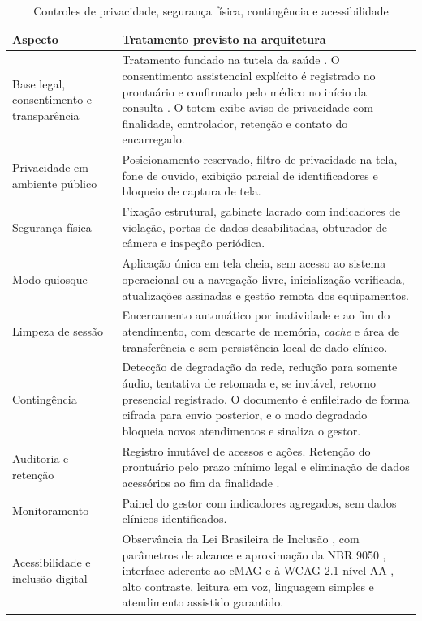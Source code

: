 \begin{table}[H]
\centering
\caption{Controles de privacidade, segurança física, contingência e acessibilidade}
\label{tab:controles}
\footnotesize
\begin{tabularx}{\textwidth}{L{3.3cm} Y}
\toprule
\textbf{Aspecto} & \textbf{Tratamento previsto na arquitetura} \\
\midrule
Base legal, consentimento e transparência & Tratamento fundado na tutela da saúde \cite{lgpd2018}. O consentimento assistencial explícito é registrado no prontuário e confirmado pelo médico no início da consulta \cite{cfm2314}. O totem exibe aviso de privacidade com finalidade, controlador, retenção e contato do encarregado. \\
Privacidade em ambiente público & Posicionamento reservado, filtro de privacidade na tela, fone de ouvido, exibição parcial de identificadores e bloqueio de captura de tela. \\
Segurança física & Fixação estrutural, gabinete lacrado com indicadores de violação, portas de dados desabilitadas, obturador de câmera e inspeção periódica. \\
Modo quiosque & Aplicação única em tela cheia, sem acesso ao sistema operacional ou a navegação livre, inicialização verificada, atualizações assinadas e gestão remota dos equipamentos. \\
Limpeza de sessão & Encerramento automático por inatividade e ao fim do atendimento, com descarte de memória, \textit{cache} e área de transferência e sem persistência local de dado clínico. \\
Contingência & Detecção de degradação da rede, redução para somente áudio, tentativa de retomada e, se inviável, retorno presencial registrado. O documento é enfileirado de forma cifrada para envio posterior, e o modo degradado bloqueia novos atendimentos e sinaliza o gestor. \\
Auditoria e retenção & Registro imutável de acessos e ações. Retenção do prontuário pelo prazo mínimo legal \cite{lei13787} e eliminação de dados acessórios ao fim da finalidade \cite{lgpd2018}. \\
Monitoramento & Painel do gestor com indicadores agregados, sem dados clínicos identificados. \\
Acessibilidade e inclusão digital & Observância da Lei Brasileira de Inclusão \cite{lbi2015}, com parâmetros de alcance e aproximação da NBR 9050 \cite{nbr9050}, interface aderente ao eMAG \cite{emag} e à WCAG 2.1 nível AA \cite{wcag21}, alto contraste, leitura em voz, linguagem simples e atendimento assistido garantido. \\
\bottomrule
\end{tabularx}
\end{table}

